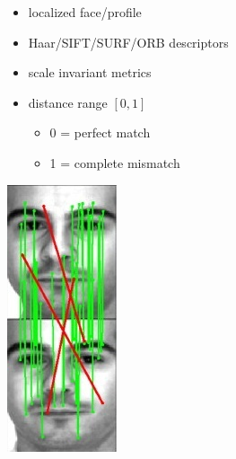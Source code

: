 
\begin{xpsectionbox}{}{}

\begin{minipage}{0.37\linewidth}
{\vspace*{0.2cm}\noindent\hspace*{0.2cm}{\bf\Titlesize Method}\newline}{\vspace{-0.75cm}}
\begin{itemize}
	\item localized face/profile
	\item Haar/SIFT/SURF/ORB descriptors
	\item scale invariant metrics
	\item distance range $[0,1]$
	\begin{itemize}
		\item 0 = perfect match
		\item 1 = complete mismatch
	\end{itemize}
\end{itemize}
\end{minipage}
\begin{minipage}{0.25\linewidth}
\begin{center}
	\includegraphics[width=0.5\linewidth]{images/face_match_sift}

\end{center}
\end{minipage}
\end{xpsectionbox}
